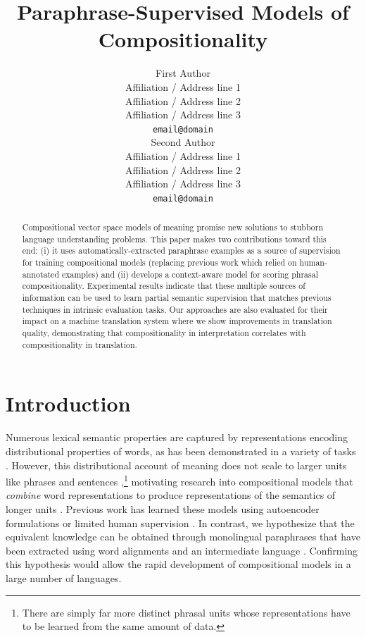 \documentclass[11pt]{article}
\title{Paraphrase-Supervised Models of Compositionality}
\author{First Author \\
  Affiliation / Address line 1 \\
  Affiliation / Address line 2 \\
  Affiliation / Address line 3 \\
  {\tt email@domain} \\\And
  Second Author \\
  Affiliation / Address line 1 \\
  Affiliation / Address line 2 \\
  Affiliation / Address line 3 \\
  {\tt email@domain} \\}
\date{}
\begin{document}
\maketitle
\begin{abstract}
Compositional vector space models of meaning promise new solutions to stubborn language understanding problems. 
This paper makes two contributions toward this end: (i) it uses automatically-extracted paraphrase examples as a source of supervision for training compositional models (replacing previous work which relied on human-annotated examples) and (ii) develops a context-aware model for scoring phrasal compositionality. 
	Experimental results indicate that these multiple sources of information can be used to learn partial semantic supervision that matches previous techniques in intrinsic evaluation tasks. 
	Our approaches are also evaluated for their impact on a machine translation system where we show improvements in translation quality, demonstrating that compositionality in interpretation correlates with compositionality in translation. 
 \end{abstract}

\section{Introduction}

Numerous lexical semantic properties are captured by representations encoding distributional properties of words, as has been demonstrated in a variety of tasks \cite{Turian2010,Turney2010,Mikolov2013b}.
However, this distributional account of meaning does not scale to larger units like phrases and sentences \cite[\emph{inter alia}]{Sahlgren2006,Collobert2011},\footnote{There are simply far more distinct phrasal units whose representations have to be learned from the same amount of data.} motivating research into compositional models that \emph{combine} word representations to produce representations of the semantics of longer units \cite{Mitchell2010,Baroni2010,Socher2013}.  
Previous work has learned these models using autoencoder formulations \cite{Socher2011} or limited human supervision \cite{Mitchell2010}.
In contrast, we hypothesize that the equivalent knowledge can be obtained through monolingual paraphrases that have been extracted using word alignments and an intermediate language \cite{Ganitkevich2013}.
Confirming this hypothesis would allow the rapid development of compositional models in a large number of languages. 
\end{document}
